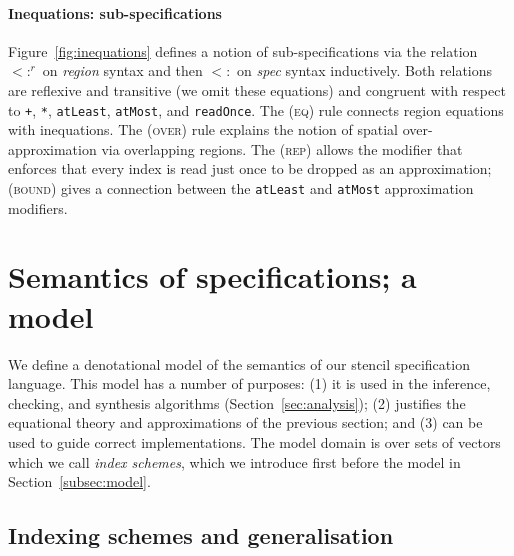 \documentclass[9pt,preprint]{sigplanconf}
\theoremstyle{definition}
\newcommand{\term}[1]{\texttt{#1}}
\newcommand{\trule}[1]{{\footnotesize{#1}}}
\begin{document}
\paragraph{Inequations: sub-specifications}

Figure~\ref{fig:inequations} defines a notion of sub-specifications
via the relation $<:^r$ on \textit{region}
syntax and then $<:$ on \textit{spec} syntax inductively.
Both relations are reflexive and transitive (we omit
these equations) and congruent
with respect to \term{+}, \term{*}, \term{atLeast}, \term{atMost},
and \term{readOnce}. The (\trule{\textsc{eq}}) rule connects region
equations with inequations. The (\trule{\textsc{over}}) rule explains
the notion of spatial over-approximation via overlapping regions.
The (\trule{\textsc{rep}}) allows the modifier that
enforces that every index is read just once to be dropped
as an approximation; (\trule{\textsc{bound}}) gives
a connection between the \term{atLeast} and \term{atMost}
approximation modifiers.

\section{Semantics of specifications; a model}
\label{sec:semantics}

\newcommand{\domainVal}{\mathbb{Z}_\infty}

We define a denotational model of the semantics of our 
stencil specification language. This model has a number of purposes: (1) it is used in the inference,
checking, and synthesis algorithms (Section~\ref{sec:analysis}); (2)
justifies the equational
theory and approximations of the previous section; and (3) can be used
to guide correct implementations. The model domain is over sets of vectors which we call \emph{index
  schemes}, which we introduce first before the model in Section~\ref{subsec:model}.

\subsection{Indexing schemes and generalisation}
\label{subsec:schemes-and-gen}
\end{document}
